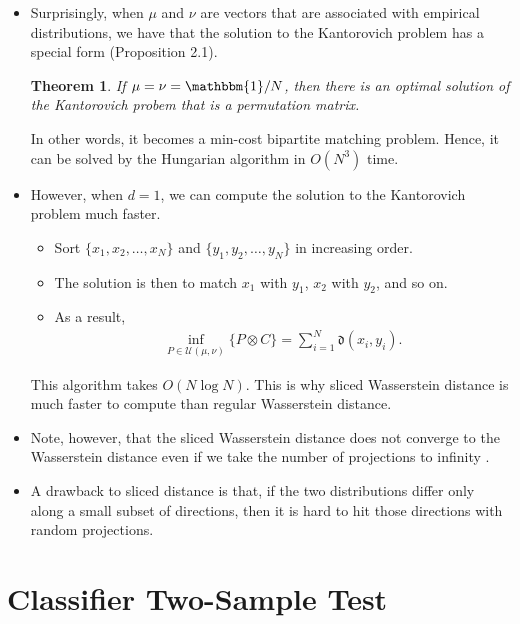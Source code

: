 \documentclass[10pt]{article}
\newtheorem{theorem}[lemma]{Theorem}
\newcommand{\mcal}[1]{\mathcal{#1}}
\begin{document}
\begin{itemize}
    \item Surprisingly, when $\mu$ and $\nu$ are vectors that are associated with empirical distributions, we have that the solution to the Kantorovich problem has a special form \cite{Peyre:2019} (Proposition 2.1).
    
    \begin{theorem}
        If $\mu = \nu = \mathbbm{1}/N$, then there is an optimal solution of the Kantorovich probem that is a permutation matrix.
    \end{theorem}

    In other words, it becomes a min-cost bipartite matching problem. Hence, it can be solved by the Hungarian algorithm in $O(N^3)$ time.

    \item However, when $d = 1$, we can compute the solution to the Kantorovich problem much faster.
    \begin{itemize}
        \item Sort $\{ x_1, x_2, \dotsc, x_N \}$ and $\{ y_1, y_2, \dotsc, y_N \}$ in increasing order.
        \item The solution is then to match $x_1$ with $y_1$, $x_2$ with $y_2$, and so on.
        \item As a result,
        \begin{align*}
            \inf_{P \in \mcal{U}(\mu, \nu)} \{ P  \otimes C \} = \sum_{i=1}^N \mathfrak{d}(x_i, y_i).
        \end{align*}
    \end{itemize}
    This algorithm takes $O(N \log N)$. This is why sliced Wasserstein distance is much faster to compute than regular Wasserstein distance.
    
    \item Note, however, that the sliced Wasserstein distance does not converge to the Wasserstein distance even if we take the number of projections to infinity \cite{Nadjahi:2022}.
    
    \item A drawback to sliced distance is that, if the two distributions differ only along a small subset of directions, then it is hard to hit those directions with random projections.
\end{itemize}

\section{Classifier Two-Sample Test}
\end{document}
